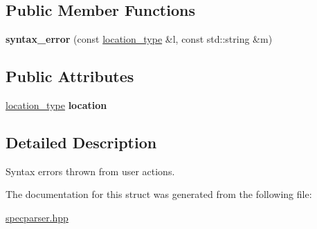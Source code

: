 \subsection*{Public Member Functions}
\begin{DoxyCompactItemize}
\item 
{\bfseries syntax\+\_\+error} (const \hyperlink{classyy_1_1spec__parser_aeb5b1e66f65306eca737db5dfa61590d}{location\+\_\+type} \&l, const std\+::string \&m)\hypertarget{structyy_1_1spec__parser_1_1syntax__error_ad7124e428b7b2c2fa860b7665066a588}{}\label{structyy_1_1spec__parser_1_1syntax__error_ad7124e428b7b2c2fa860b7665066a588}

\end{DoxyCompactItemize}
\subsection*{Public Attributes}
\begin{DoxyCompactItemize}
\item 
\hyperlink{classyy_1_1spec__parser_aeb5b1e66f65306eca737db5dfa61590d}{location\+\_\+type} {\bfseries location}\hypertarget{structyy_1_1spec__parser_1_1syntax__error_a54a40a670915ec37c264df1c65f5925c}{}\label{structyy_1_1spec__parser_1_1syntax__error_a54a40a670915ec37c264df1c65f5925c}

\end{DoxyCompactItemize}


\subsection{Detailed Description}
Syntax errors thrown from user actions. 

The documentation for this struct was generated from the following file\+:\begin{DoxyCompactItemize}
\item 
\hyperlink{specparser_8hpp}{specparser.\+hpp}\end{DoxyCompactItemize}
